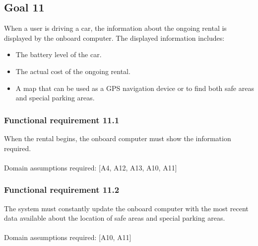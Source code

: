 \subsection{Goal 11}
When a user is driving a car, the information about the ongoing rental is displayed by the onboard computer. The displayed information includes:
\begin{itemize}
		\item The battery level of the car.
		\item The actual cost of the ongoing rental.
		\item A map that can be used as a GPS navigation device or to find both safe areas and special parking areas.
\end{itemize}

\setcounter{secnumdepth}{3}
\subsubsection{Functional requirement 11.1}
When the rental begins, the onboard computer must show the information required.\\~\\
\noindent Domain assumptions required: [A4, A12, A13, A10, A11]

\subsubsection{Functional requirement 11.2}
The system must constantly update the onboard computer with the most recent data available about the location of safe areas and special parking areas.\\~\\
\noindent Domain assumptions required: [A10, A11]

